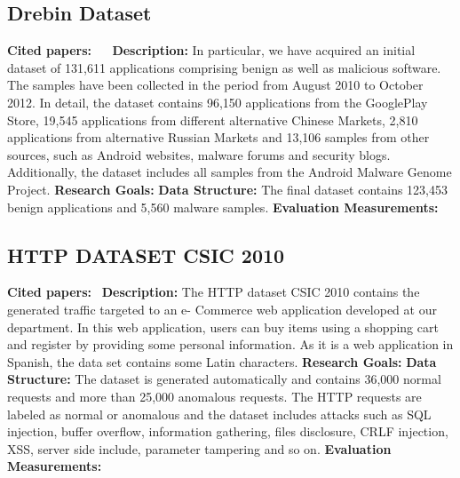 \subsection{Drebin Dataset}
\textbf{Cited papers:} ~\cite{arp2014drebin}~\cite{torrano2009self}\newline
\textbf{Description:} In particular, we have acquired an initial dataset of 131,611 applications comprising benign as well as malicious software. The samples have been collected in the period from August 2010 to October 2012. In detail, the dataset contains 96,150 applications from the GooglePlay Store, 19,545 applications from different alternative Chinese Markets, 2,810 applications from alternative Russian Markets and 13,106 samples from other sources, such as Android websites, malware forums and security blogs. Additionally, the dataset includes all samples from the Android Malware Genome Project. \newline
\textbf{Research Goals:}  \newline
\textbf{Data Structure:} The final dataset contains 123,453 benign applications and 5,560 malware samples. \newline
\textbf{Evaluation Measurements:} \newline


\subsection{HTTP DATASET CSIC 2010}
\textbf{Cited papers:}~\cite{torrano2009self} \newline
\textbf{Description:}  The HTTP dataset CSIC 2010 contains the generated traffic targeted to an e- Commerce web application developed at our department. In this web application, users can buy items using a shopping cart and register by providing some personal information. As it is a web application in Spanish, the data set contains some Latin characters. \newline
\textbf{Research Goals:}  \newline
\textbf{Data Structure:} The dataset is generated automatically and contains 36,000 normal requests and more than 25,000 anomalous requests. The HTTP requests are labeled as normal or anomalous and the dataset includes attacks such as SQL injection, buffer overflow, information gathering, files disclosure, CRLF injection, XSS, server side include, parameter tampering and so on.\newline
\textbf{Evaluation Measurements:} \newline



